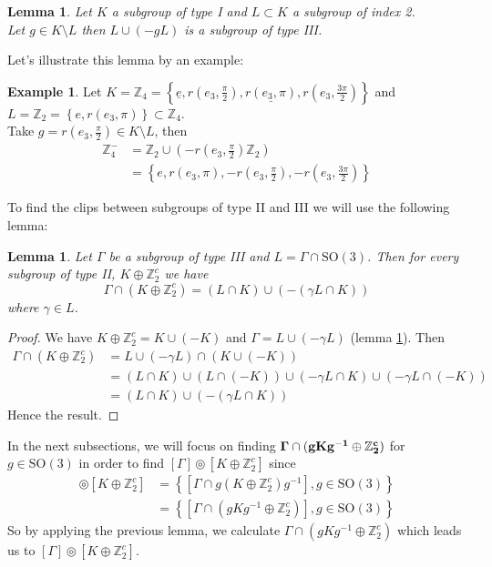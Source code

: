 \documentclass[11pt,a4paper]{amsart}
\newtheorem{lem}[thm]{Lemma}
\theoremstyle{definition}
\newtheorem{exmp}[thm]{Example}
\newcommand{\ZZ}{\mathbb{Z}}                %
\newcommand{\SO}{\mathrm{SO}}               %
\newcommand{\1}{\mathds{1}}		            %
\newcommand{\set}[1]{\left\{#1\right\}}     %
\begin{document}
\begin{lem}\label{lem:4.1}
Let $K$ a subgroup of type I and $L\subset K$ a subgroup of index 2. \\
Let $g\in K \setminus L$ then $L\cup (-g L)$ is a subgroup of type III.
\end{lem}

Let's illustrate this lemma by an example:
\begin{exmp}\label{exmp:1}
Let $K=\ZZ_4=\set{\underline{e},r(e_3,\frac{\pi}{2}),\underline{r(e_3,\pi)},r(e_3,\frac{3\pi}{2})}$ and $L=\ZZ_2=\set{e,r(e_3,\pi)}\subset \ZZ_4$.
\\Take $g=r(e_3,\frac{\pi}{2})\in K\setminus L$, then
\begin{align*}
\ZZ_4^-&=\ZZ_2\cup(-r(e_3,\frac{\pi}{2})\ZZ_2)\\
       &=\set{e,r(e_3,\pi),-r(e_3,\frac{\pi}{2}),-r(e_3,\frac{3\pi}{2})}
\end{align*}
\end{exmp}


To find the clips between subgroups of type II and III we will use the following lemma:
\begin{lem}\label{thelemma}
Let $\Gamma$ be a subgroup of type III and $L=\Gamma\cap \SO(3)$. Then for every subgroup of type II, $K\oplus\ZZ_2^c$ we have
\begin{equation*}
\Gamma\cap(K\oplus \ZZ_2^c)=(L\cap K)\cup(-(\gamma L\cap K))
\end{equation*}
where $\gamma\in L$.
\end{lem}
\begin{proof}
We have $K\oplus \ZZ_2^c=K\cup (-K)$ and $\Gamma=L\cup (-\gamma L)$ (lemma \ref{lem:4.1}). Then
\begin{align*}
\Gamma\cap (K\oplus \ZZ_2^c)&=L\cup(-\gamma L)\cap(K\cup (-K))\\
                            &=(L\cap K)\cup (L\cap(-K))\cup (-\gamma L\cap K)\cup (-\gamma L\cap(-K)) \\
                            &=(L\cap K)\cup (-(\gamma L\cap K))
\end{align*}
Hence the result.
\end{proof}

\par In the next subsections, we will focus on finding $\bf{\Gamma\cap (g K g^{-1}\oplus \ZZ_2^c)}$ for $g\in \SO(3)$ in order to find $[\Gamma] \circledcirc [K\oplus \ZZ_2^c]$ since
\begin{align*}
[\Gamma] \circledcirc [K\oplus \ZZ_2^c]&=\set{[\Gamma\cap g(K\oplus \ZZ_2^c)g^{-1}],g\in \SO(3)}\\
                                     &=\set{[\Gamma\cap (g K g^{-1}\oplus \ZZ_2^c)],g\in \SO(3)}
\end{align*}
So by applying the previous lemma, we calculate $\Gamma\cap (g K g^{-1}\oplus \ZZ_2^c)$ which leads us to $[\Gamma] \circledcirc [K\oplus \ZZ_2^c]$.
\end{document}
